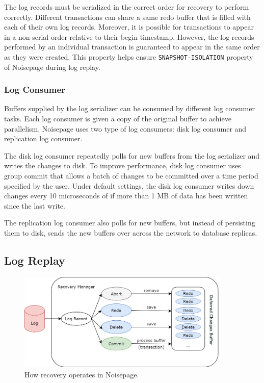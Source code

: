 \documentclass[12pt]{cmuthesis}
\begin{document}
The log records must be serialized in the correct order for recovery to perform correctly. Different transactions can share a same redo buffer that is filled with each of their own log records. Moreover, it is possible for transactions to appear in a non-serial order relative to their begin timestamp. However, the log records performed by an individual transaction is guaranteed to appear in the same order as they were created. This property helps ensure \texttt{SNAPSHOT-ISOLATION} property of Noisepage during log replay.
\subsubsection{Log Consumer}
Buffers supplied by the log serializer can be consumed by different log consumer tasks. Each log consumer is given a copy of the original buffer to achieve parallelism. Noisepage uses two type of log consumers: disk log consumer and replication log consumer.

The disk log consumer repeatedly polls for new buffers from the log serializer and writes the changes to disk. To improve performance, disk log consumer uses group commit that allows a batch of changes to be committed over a time period specified by the user. Under default settings, the disk log consumer writes down changes every 10 microseconds of if more than 1 MB of data has been written since the last write.

The replication log consumer also polls for new buffers, but instead of persisting them to disk, sends the new buffers over across the network to database replicas.

\subsection{Log Replay}
\begin{figure}[H]
\centering
\includegraphics[width=0.9\textwidth]{images/RecoveryManager.png}
\caption{How recovery operates in Noisepage.}
\label{fig:recoverymanager}
\end{figure}
\end{document}
